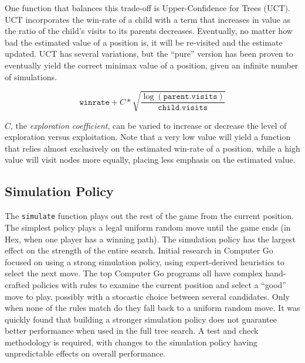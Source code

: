 \documentclass[10pt,a4paper]{report}
\begin{document}
One function that balances this trade-off is Upper-Confidence for Trees (UCT). UCT incorporates the win-rate of a child with a term that increases in value as the ratio of the child's visits to its parents decreases. Eventually, no matter how bad the estimated value of a position is, it will be re-visited and the estimate updated. UCT has several variations, but the ``pure'' version has been proven to eventually yield the correct minimax value of a position, given an infinite number of simulations\cite{gelly2006exploration}.

\[
	\texttt{winrate} + C*\sqrt{\frac{\log{(\texttt{parent.visits})}}{\texttt{child.visits}}}
\]

$C$, the \emph{exploration coefficient}, can be varied to increase or decrease the level of exploration versus exploitation. Note that a very low value will yield a function that relies almost exclusively on the estimated win-rate of a position, while a high value will visit nodes more equally, placing less emphasis on the estimated value.

\subsection{Simulation Policy}
The \texttt{simulate} function plays out the rest of the game from the current position. The simplest policy plays a legal uniform random move until the game ends (in Hex, when one player has a winning path). The simulation policy has the largest effect on the strength of the entire search. Initial research in Computer Go focused on using a strong simulation policy, using expert-derived heuristics to select the next move. The top Computer Go programs all have complex hand-crafted policies with rules to examine the current position and select a ``good'' move to play, possibly with a stocastic choice between several candidates. Only when none of the rules match do they fall back to a uniform random move. It was quickly found that building a stronger simulation policy does not guarantee better performance when used in the full tree search. A test and check methodology is required, with changes to the simulation policy having unpredictable effects on overall performance.
\end{document}
